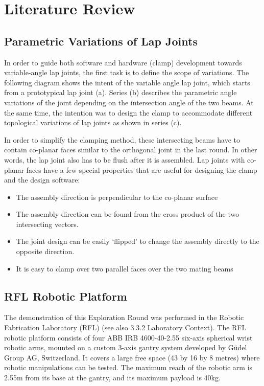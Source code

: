 \section{Literature Review}
\label{section:exploration_2_literature_review}

\subsection{Parametric Variations of Lap Joints}
\label{subsection:exploration_2_parametric_variations_of_lap_joints}

In order to guide both software and hardware (clamp) development towards variable-angle lap joints, the first task is to define the scope of variations. The following diagram shows the intent of the variable angle lap joint, which starts from a prototypical lap joint (a). Series (b) describes the parametric angle variations of the joint depending on the intersection angle of the two beams. At the same time, the intention was to design the clamp to accommodate different topological variations of lap joints as shown in series (c).

In order to simplify the clamping method, these intersecting beams have to contain co-planar faces similar to the orthogonal joint in the last round. In other words, the lap joint also has to be flush after it is assembled. Lap joints with co-planar faces have a few special properties that are useful for designing the clamp and the design software:

\begin{itemize}
    \item The assembly direction is perpendicular to the co-planar surface
    \item The assembly direction can be found from the cross product of the two intersecting vectors.
    \item The joint design can be easily ‘flipped’ to change the assembly directly to the opposite direction.
    \item It is easy to clamp over two parallel faces over the two mating beams
\end{itemize}

\subsection{RFL Robotic Platform}
\label{subsection:exploration_2_rfl_robotic_platform}

The demonstration of this Exploration Round was performed in the Robotic Fabrication Laboratory (RFL) (see also 3.3.2 Laboratory Context). The RFL robotic platform consists of four ABB IRB 4600-40-2.55 six-axis spherical wrist robotic arms, mounted on a custom 3-axis gantry system developed by Güdel Group AG, Switzerland. It covers a large free space (43 by 16 by 8 metres) where robotic manipulations can be tested. The maximum reach of the robotic arm is 2.55m from its base at the gantry, and its maximum payload is 40kg.


